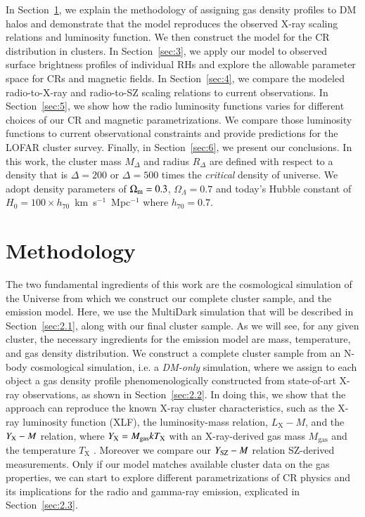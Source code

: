 \documentclass[traditabstract]{aa}
\newcommand{\rmn}{\mathrm}
\begin{document}
In Section~\ref{sec:2}, we explain the methodology of assigning gas density
profiles to DM halos and demonstrate that the model reproduces the observed
X-ray scaling relations and luminosity function. We then construct the model for
the CR distribution in clusters. In Section~\ref{sec:3}, we apply our model to
observed surface brightness profiles of individual RHs and explore the allowable
parameter space for CRs and magnetic fields.  In Section~\ref{sec:4}, we compare
the modeled radio-to-X-ray and radio-to-SZ scaling relations to current
observations.  In Section~\ref{sec:5}, we show how the radio luminosity
functions varies for different choices of our CR and magnetic
parametrizations. We compare those luminosity functions to current observational
constraints and provide predictions for the LOFAR cluster survey. Finally, in
Section~\ref{sec:6}, we present our conclusions.  In this work, the cluster mass
$M_{\Delta}$ and radius $R_{\Delta}$ are defined with respect to a density that
is $\Delta=200$ or $\Delta=500$ times the \emph{critical} density of
universe. We adopt density parameters of $\Omega_{\rm{m}}=0.3$,
$\Omega_{\Lambda}=0.7$ and today's Hubble constant of $H_0 = 100 \times
h_{70}$~km~s$^{-1}$~Mpc$^{-1}$ where $h_{70} = 0.7$.


\section{Methodology}
\label{sec:2}
The two fundamental ingredients of this work are the cosmological simulation of
the Universe from which we construct our complete cluster sample, and the
emission model. Here, we use the MultiDark simulation that will be described in
Section~\ref{sec:2.1}, along with our final cluster sample. As we will see, for
any given cluster, the necessary ingredients for the emission model are mass,
temperature, and gas density distribution. We construct a complete cluster
sample from an N-body cosmological simulation, i.e. a \emph{DM-only} simulation,
where we assign to each object a gas density profile phenomenologically
constructed from state-of-art X-ray observations, as shown in
Section~\ref{sec:2.2}. In doing this, we show that the approach can reproduce
the known X-ray cluster characteristics, such as the X-ray luminosity function
(XLF), the luminosity-mass relation, $L_{\rmn{X}}- M$, and the $Y_{\rm{X}}-M$
relation, where $Y_{\rm{X}}=M_\rmn{gas}kT_{\rmn{X}}$ with an X-ray-derived gas
mass $M_{\rmn{gas}}$ and the temperature $T_{\rmn{X}}$
\citep{2006ApJ...650..128K}. Moreover we compare our $Y_{\rm{SZ}}-M$ relation
SZ-derived measurements.  Only if our model matches available cluster data on
the gas properties, we can start to explore different parametrizations of CR
physics and its implications for the radio and gamma-ray emission, explicated in
Section~\ref{sec:2.3}.
\end{document}
